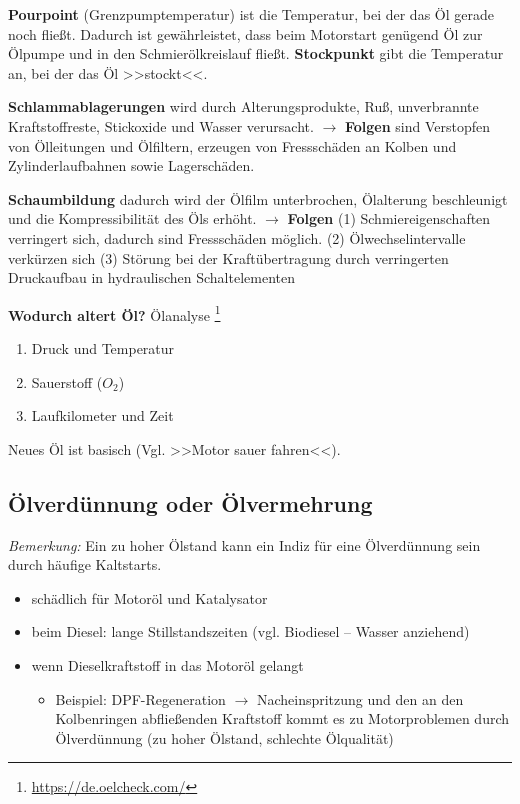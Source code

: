 \textbf{Pourpoint} (Grenzpumptemperatur) ist die Temperatur, bei der das
Öl gerade noch fließt. Dadurch ist gewährleistet, dass beim Motorstart
genügend Öl zur Ölpumpe und in den Schmierölkreislauf fließt.
\textbf{Stockpunkt} gibt die Temperatur an, bei der das Öl >>stockt<<.

\textbf{Schlammablagerungen} wird durch Alterungsprodukte, Ruß,
unverbrannte Kraftstoffreste, Stickoxide und Wasser verursacht. $\to$
\textbf{Folgen} sind Verstopfen von Ölleitungen und Ölfiltern, erzeugen
von Fressschäden an Kolben und Zylinderlaufbahnen sowie Lagerschäden.

\textbf{Schaumbildung} dadurch wird der Ölfilm unterbrochen, Ölalterung
beschleunigt und die Kompressibilität des Öls erhöht. $\to$
\textbf{Folgen} (1) Schmiereigenschaften verringert sich, dadurch sind
Fressschäden möglich. (2) Ölwechselintervalle verkürzen sich (3) Störung
bei der Kraftübertragung durch verringerten Druckaufbau in hydraulischen
Schaltelementen

\textbf{Wodurch altert Öl?} Ölanalyse \footnote{\url{https://de.oelcheck.com/}}

\begin{enumerate}
\item
  Druck und Temperatur
\item
  Sauerstoff ($O_2$)
\item
  Laufkilometer und Zeit
\end{enumerate}

Neues Öl ist basisch (Vgl. >>Motor sauer fahren<<).

\subsection{Ölverdünnung oder
Ölvermehrung}\label{oelverduennung-oder-oelvermehrung}

\emph{Bemerkung:} Ein zu hoher Ölstand kann ein Indiz für eine
Ölverdünnung sein durch häufige Kaltstarts.

\begin{itemize}
\item
  schädlich für Motoröl und Katalysator
\item
  beim Diesel: lange Stillstandszeiten (vgl. Biodiesel -- Wasser
  anziehend)
\item
  wenn Dieselkraftstoff in das Motoröl gelangt

  \begin{itemize}
  \item
    Beispiel: DPF-Regeneration $\to$ Nacheinspritzung und den an den
    Kolbenringen abfließenden Kraftstoff kommt es zu Motorproblemen
    durch Ölverdünnung (zu hoher Ölstand, schlechte Ölqualität)
  \end{itemize}
\end{itemize}

